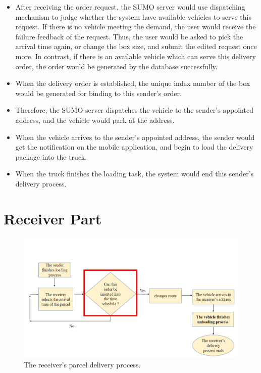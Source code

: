 \documentclass[12pt]{ksthesis}
\begin{document}
\begin{thesis}
{\begin{itemize}
\item
After receiving the order request, the SUMO server would use dispatching mechanism to judge whether the system have available vehicles to serve this request. If there is no vehicle meeting the demand, the user would receive the failure feedback of the request. Thus, the user would be asked to pick the arrival time again, or change the box size, and submit the edited request once more.
In contrast, if there is an available vehicle which can serve this delivery order, the order would be generated by the database successfully.

\item
When the delivery order is established, the unique index number of the box would be generated for binding to this sender’s order.

\item
Therefore, the SUMO server dispatches the vehicle to the sender’s appointed address, and the vehicle would park at the address.

\item
When the vehicle arrives to the sender’s appointed address, the sender would get the notification on the mobile application, and begin to load the delivery package into the truck.

\item
When the truck finishes the loading task, the system would end this sender’s delivery process.

\end{itemize}

\section{Receiver Part}

\begin{figure}[H]
\centering
\includegraphics[scale=0.45]{./Thesis_figures/F5-2_receiver_delivery_process.PNG}
\caption{\large The receiver's parcel delivery process.}
\vspace{0.5cm}
\label{Fig:receiver_process}
\end{figure}

}
\end{thesis}
\end{document}
